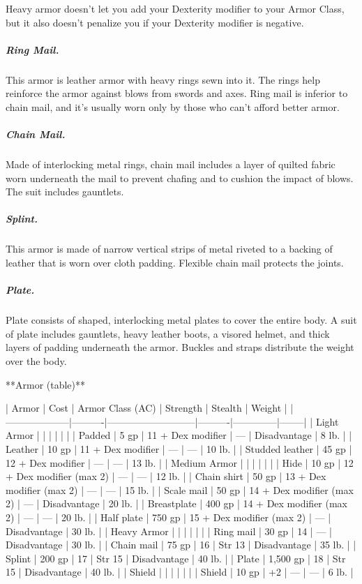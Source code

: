 Heavy armor doesn't let you add your Dexterity modifier to your Armor Class, but it also doesn't penalize you if your Dexterity modifier is negative.

\subparagraph*{Ring Mail.} This armor is leather armor with heavy rings sewn into it. The rings help reinforce the armor against blows from swords and axes. Ring mail is inferior to chain mail, and it's usually worn only by those who can't afford better armor.

\subparagraph*{Chain Mail.} Made of interlocking metal rings, chain mail includes a layer of quilted fabric worn underneath the mail to prevent chafing and to cushion the impact of blows. The suit includes gauntlets.

\subparagraph*{Splint.} This armor is made of narrow vertical strips of metal riveted to a backing of leather that is worn over cloth padding. Flexible chain mail protects the joints.

\subparagraph*{Plate.} Plate consists of shaped, interlocking metal plates to cover the entire body. A suit of plate includes gauntlets, heavy leather boots, a visored helmet, and thick layers of padding underneath the armor. Buckles and straps distribute the weight over the body.

**Armor (table)**

| Armor              | Cost     | Armor Class (AC)          | Strength | Stealth      | Weight |
|--------------------|----------|---------------------------|----------|--------------|--------|
| Light Armor  |          |                           |          |              |        |
| Padded             | 5 gp     | 11 + Dex modifier         | —        | Disadvantage | 8 lb.  |
| Leather            | 10 gp    | 11 + Dex modifier         | —        | —            | 10 lb. |
| Studded leather    | 45 gp    | 12 + Dex modifier         | —        | —            | 13 lb. |
| Medium Armor |          |                           |          |              |        |
| Hide               | 10 gp    | 12 + Dex modifier (max 2) | —        | —            | 12 lb. |
| Chain shirt        | 50 gp    | 13 + Dex modifier (max 2) | —        | —            | 15 lb. |
| Scale mail         | 50 gp    | 14 + Dex modifier (max 2) | —        | Disadvantage | 20 lb. |
| Breastplate        | 400 gp   | 14 + Dex modifier (max 2) | —        | —            | 20 lb. |
| Half plate         | 750 gp   | 15 + Dex modifier (max 2) | —        | Disadvantage | 30 lb. |
| Heavy Armor  |          |                           |          |              |        |
| Ring mail          | 30 gp    | 14                        | —        | Disadvantage | 30 lb. |
| Chain mail         | 75 gp    | 16                        | Str 13   | Disadvantage | 35 lb. |
| Splint             | 200 gp   | 17                        | Str 15   | Disadvantage | 40 lb. |
| Plate              | 1,500 gp | 18                        | Str 15   | Disadvantage | 40 lb. |
| Shield       |          |                           |          |              |        |
| Shield             | 10 gp    | +2                        | —        | —            | 6 lb.  |


